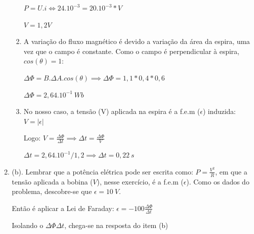 \documentclass[12pt,letterpaper,fleqn]{article}
\begin{document}
\begin{enumerate}
\begin{enumerate}
            $P = U.i \iff 24.10^{-3} = 20.10^{-3}*V$
            
            $V = 1,2 V$
            
            \item A variação do fluxo magnético é devido a variação da área da espira, uma vez que o campo é constante. Como o campo é perpendicular à espira, $cos(\theta) =1$:
            
            $\Delta \Phi = B. \Delta A. cos(\theta) \implies \Delta \Phi = 1,1*0,4*0,6$
            
            $\Delta \Phi = 2,64.10^{-1} \: Wb$
            
            \item No nosso caso, a tensão (V) aplicada na espira é a f.e.m ($\epsilon$) induzida: $V = |\epsilon|$
            
            Logo: $V = \frac{\Delta \Phi}{\Delta t} \implies \Delta t = \frac{\Delta \Phi}{V}$
            
            $\Delta t = 2,64.10^{-1}/1,2 \implies  \Delta t = 0,22 \: s$
        \end{enumerate}
        
        \item (b). Lembrar que a potência elétrica pode ser escrita como: $P = \frac{V^2}{R}$, em que a tensão aplicada a bobina ($V$), nesse exercício, é a f.e.m ($\epsilon$). Como os dados do problema, descobre-se que $\epsilon = 10\:V$.
        
        Então é aplicar a Lei de Faraday: $\epsilon = -100 \frac{\Delta \Phi}{\Delta t}$
        
        Isolando o ${\Delta \Phi}{\Delta t}$, chega-se na resposta do item (b)
    \end{enumerate}
\end{document}
